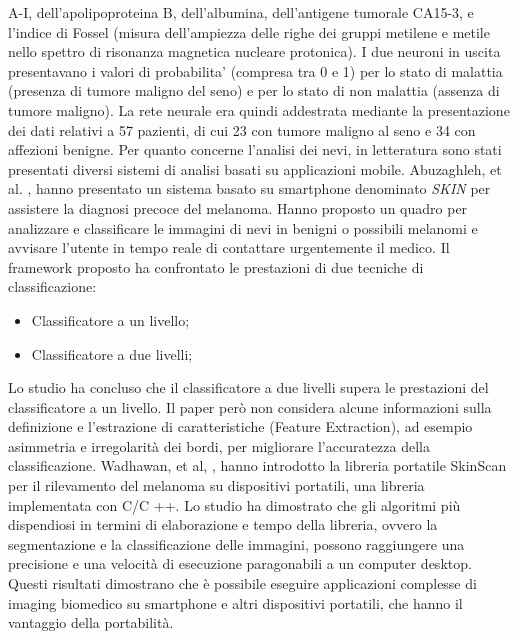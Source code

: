 {	A-I, dell'apolipoproteina B, dell'albumina, dell'antigene tumorale CA15-3, e l'indice di Fossel (misura dell'ampiezza delle righe dei gruppi metilene e metile nello spettro di risonanza magnetica nucleare protonica).
	 I due neuroni in uscita presentavano i valori di probabilita' (compresa tra 0 e 1) per lo stato di malattia (presenza di tumore maligno del seno) e per lo stato di non malattia (assenza di tumore maligno). 
	 La rete neurale era quindi addestrata mediante la presentazione dei dati relativi a 57 pazienti, di cui 23 con tumore maligno al seno e 34 con affezioni benigne.
	\newline
	\newline
	Per quanto concerne l'analisi dei nevi, in letteratura sono stati presentati diversi sistemi di analisi basati su applicazioni mobile.
	\newline
	Abuzaghleh, et al. \cite{abuzaghleh2014skincure}, hanno presentato un sistema basato su smartphone denominato \textit{SKIN} per assistere la diagnosi precoce del melanoma. Hanno proposto un quadro per analizzare e classificare le immagini di nevi in benigni o possibili melanomi e avvisare l'utente in tempo reale di contattare urgentemente il medico.
	\newline
	Il framework proposto ha confrontato le prestazioni di due tecniche di classificazione:
	\begin{itemize}
		\item Classificatore a un livello;
		\item Classificatore a due livelli;
	\end{itemize}
	Lo studio ha concluso che il classificatore a due livelli supera le prestazioni del classificatore a un livello.
	\newline
	Il paper però non considera alcune informazioni sulla definizione e l'estrazione di caratteristiche (Feature Extraction), ad esempio asimmetria e irregolarità dei bordi, per migliorare l'accuratezza della classificazione.
	\newline
	\newline
	Wadhawan, et al, \cite{wadhawan2011skinscan}, hanno introdotto la libreria portatile SkinScan per il rilevamento del melanoma su dispositivi portatili, una libreria implementata con C/C ++. 
	\newline
	Lo studio ha dimostrato che gli algoritmi più dispendiosi in termini di elaborazione e tempo della libreria, ovvero la segmentazione e la classificazione delle immagini, possono raggiungere una precisione e una velocità di esecuzione paragonabili a un computer desktop. Questi risultati dimostrano che è possibile eseguire applicazioni complesse di imaging biomedico su smartphone e altri dispositivi portatili, che hanno il vantaggio della portabilità.
}
